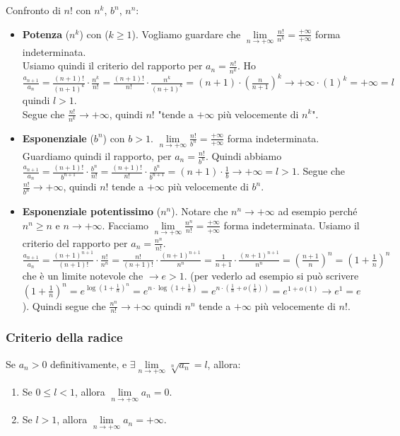 \hspace{-15pt}Confronto di $n!$ con $n^k$, $b^n$, $n^n$:
\begin{itemize}
    \item \textbf{Potenza} ($n^k$) con ($k\geq 1$). Vogliamo guardare che $\lim\limits_{n\to +\infty}\frac{n!}{n^k} = \frac{+\infty}{+\infty}$ forma indeterminata.\\
    Usiamo quindi il criterio del rapporto per $a_n = \frac{n!}{n^k}$. Ho $\frac{a_{n+1}}{a_n} = \frac{(n+1)!}{(n+1)^k} \cdot \frac{n^k}{n!} = \frac{(n+1)!}{n!} \cdot \frac{n^k}{(n+1)^k} = (n+1) \cdot (\frac{n}{n+1})^k \to +\infty \cdot (1)^k = +\infty = l$ quindi $l > 1$.\\
    Segue che $\frac{n!}{n^k} \to +\infty$, quindi $n!$ "tende a $+\infty$ più velocemente di $n^k$".
    \item \textbf{Esponenziale} ($b^n$) con $b > 1$. $\lim\limits_{n\to +\infty} \frac{n!}{b^n} = \frac{+\infty}{+\infty}$ forma indeterminata. Guardiamo quindi il rapporto, per $a_n = \frac{n!}{b^n}$. Quindi abbiamo $\frac{a_{n+1}}{a_n} = \frac{(n+1)!}{b^{n+1}} \cdot \frac{b^n}{n!} = \frac{(n+1)!}{n!} \cdot \frac{b^n}{b^{n+1}} = (n+1)\cdot \frac{1}{b} \to +\infty = l > 1$. Segue che $\frac{n!}{b^n} \to +\infty$, quindi $n!$ tende a $+\infty$ più velocemente di $b^n$.
    \item \textbf{Esponenziale potentissimo} ($n^n$). Notare che $n^n \to +\infty$ ad esempio perché $n^n \geq n$ e $n\to +\infty$. Facciamo $\lim\limits_{n\to +\infty}\frac{n^n}{n!} = \frac{+\infty}{+\infty}$ forma indeterminata. Usiamo il criterio del rapporto per $a_n = \frac{n^n}{n!}$. $\frac{a_{n+1}}{a_n} = \frac{(n+1)^{n+1}}{(n+1)!}\cdot \frac{n!}{n^n} = \frac{n!}{(n+1)!} \cdot \frac{(n+1)^{n+1}}{n^n} = \frac{1}{n+1} \cdot \frac{(n+1)^{n+1}}{n^n} = (\frac{n+1}{n})^n = (1 + \frac{1}{n})^n$ che è un limite notevole che $\to e > 1$. (per vederlo ad esempio si può scrivere $(1 + \frac{1}{n})^n = e^{\log(1+\frac{1}{n})^n} = e^{n\cdot \log(1+\frac{1}{n})} = e^{n\cdot(\frac{1}{n} + o(\frac{1}{n}))} = e^{1 + o(1)} \to e^1 = e$). Quindi segue che $\frac{n^n}{n!} \to +\infty$ quindi $n^n$ tende a $+\infty$ più velocemente di $n!$.
\end{itemize}


\subsubsection{Criterio della radice}
\begin{theorem}
Se $a_n > 0$ definitivamente, e $\exists \lim\limits_{n\to +\infty}\sqrt[n]{a_n} = l$, allora:
\begin{enumerate}
    \item Se $0 \leq l < 1$, allora $\lim\limits_{n\to +\infty} a_n = 0$.
    \item Se $l > 1$, allora $\lim\limits_{n\to +\infty}a_n = +\infty$.
\end{enumerate}
\end{theorem}

